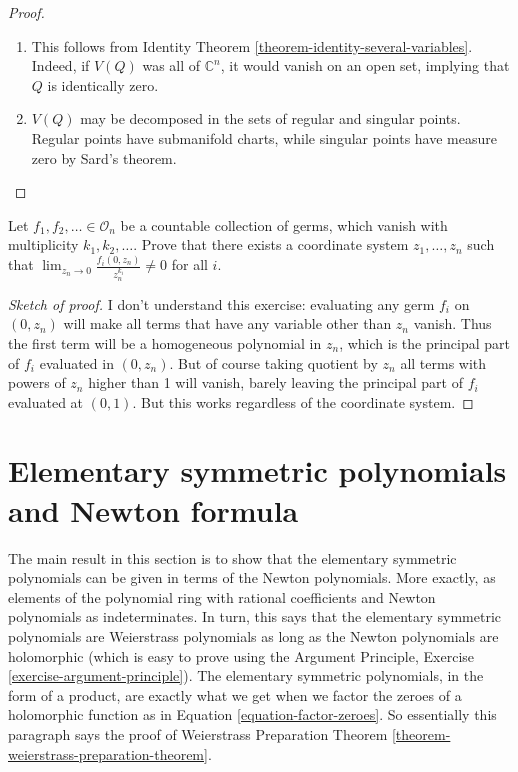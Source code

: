 \begin{proof}
\begin{enumerate}
\item This follows from Identity Theorem
\ref{theorem-identity-several-variables}. Indeed, if $V(Q)$ was all of
$\mathbb{C}^{n}$, it would vanish on an open set, implying that $Q$ is
identically zero.
\item $V(Q)$ may be decomposed in the sets of regular and singular points.
Regular points have submanifold charts, while singular points have measure zero
by Sard's theorem.
\end{enumerate}
\end{proof}

\begin{exercise}
\label{exercise-principal-parts}
Let $f_1,f_2,\ldots\in \mathcal{O}_n$ be a countable collection of germs, which
vanish with multiplicity $k_1,k_2,\ldots$. Prove that there exists a coordinate
system $z_1,\ldots,z_n$ such that 
$\lim_{z_n\to 0} \frac{f_i(0,z_n)}{z_n^{k_i}}\neq 0$ for all $i$.
\end{exercise}

\begin{proof}[Sketch of proof]
I don't understand this exercise: evaluating any germ $f_i$ on $(0,z_n)$ will
make all terms that have any variable other than $z_n$ vanish. Thus the first
term will be a homogeneous polynomial in $z_n$, which is the principal part of
$f_i$ evaluated in $(0,z_n)$. But of course taking quotient by $z_n$ all terms
with powers of $z_n$ higher than 1 will vanish, barely leaving the principal
part of $f_i$ evaluated at $(0,1)$. But this works regardless of the coordinate
system.
\end{proof}

\section{Elementary symmetric polynomials and Newton formula}
\label{section-elementary-symmetric-polynomials-and-Newton-formula}

\noindent
The main result in this section
is to show that the elementary symmetric polynomials
can be given in terms of the Newton polynomials.
More exactly, as elements of the polynomial
ring with rational coefficients and Newton polynomials
as indeterminates.
In turn, this says that the elementary symmetric polynomials
are Weierstrass polynomials as long as the Newton polynomials
are holomorphic (which is easy to prove using the Argument Principle,
Exercise \ref{exercise-argument-principle}).
The elementary symmetric polynomials, in the form of a product,
are exactly what we get when we factor the zeroes
of a holomorphic function as in Equation \ref{equation-factor-zeroes}.
So essentially this paragraph says the proof of 
Weierstrass Preparation Theorem \ref{theorem-weierstrass-preparation-theorem}.

